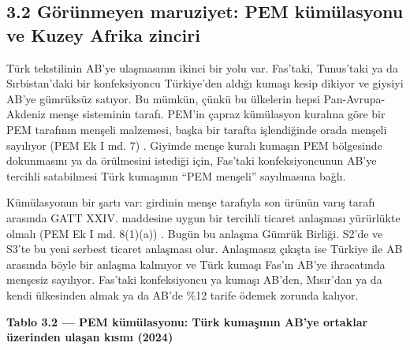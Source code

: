 \hypertarget{nace_kartlar_13-15-32-guxf6ruxfcnmeyen-maruziyet-pem-kuxfcmuxfclasyonu-ve-kuzey-afrika-zinciri}{%
\subsection{3.2 Görünmeyen maruziyet: PEM kümülasyonu ve Kuzey Afrika zinciri}\label{nace_kartlar_13-15-32-guxf6ruxfcnmeyen-maruziyet-pem-kuxfcmuxfclasyonu-ve-kuzey-afrika-zinciri}}

Türk tekstilinin AB'ye ulaşmasının ikinci bir yolu var. Fas'taki, Tunus'taki ya da Sırbistan'daki bir konfeksiyoncu Türkiye'den aldığı kumaşı kesip dikiyor ve giysiyi AB'ye gümrüksüz satıyor. Bu mümkün, çünkü bu ülkelerin hepsi Pan-Avrupa-Akdeniz menşe sisteminin tarafı. PEM'in çapraz kümülasyon kuralına göre bir PEM tarafının menşeli malzemesi, başka bir tarafta işlendiğinde orada menşeli sayılıyor (PEM Ek I md. 7) \etiketV{}. Giyimde menşe kuralı kumaşın PEM bölgesinde dokunmasını ya da örülmesini istediği için, Fas'taki konfeksiyoncunun AB'ye tercihli satabilmesi Türk kumaşının ``PEM menşeli'' sayılmasına bağlı.

Kümülasyonun bir şartı var: girdinin menşe tarafıyla son ürünün varış tarafı arasında GATT XXIV. maddesine uygun bir tercihli ticaret anlaşması yürürlükte olmalı (PEM Ek I md. 8(1)(a)) \etiketV{}. Bugün bu anlaşma Gümrük Birliği. S2'de ve S3'te bu yeni serbest ticaret anlaşması olur. Anlaşmasız çıkışta ise Türkiye ile AB arasında böyle bir anlaşma kalmıyor ve Türk kumaşı Fas'ın AB'ye ihracatında menşesiz sayılıyor. Fas'taki konfeksiyoncu ya kumaşı AB'den, Mısır'dan ya da kendi ülkesinden almak ya da AB'de \%12 tarife ödemek zorunda kalıyor.


\textbf{Tablo 3.2 --- PEM kümülasyonu: Türk kumaşının AB'ye ortaklar üzerinden ulaşan kısmı (2024)}

\nopagebreak[4]

\begingroup\gbtablo\small

